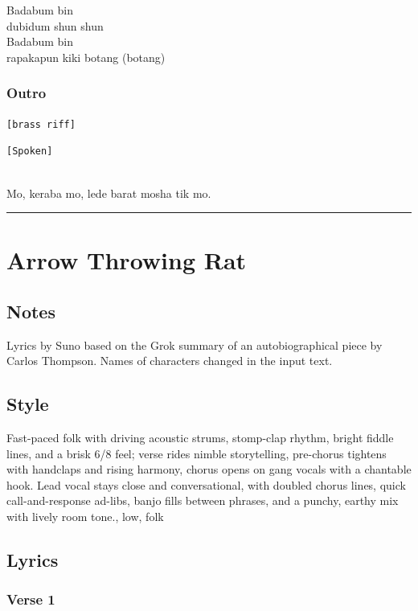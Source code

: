 Badabum bin\\
dubidum shun shun\\
Badabum bin\\
rapakapun kiki botang (botang)

\subsubsection{Outro}\label{outro-5}

\texttt{{[}brass\ riff{]}}

\texttt{{[}Spoken{]}}\strut \\
Mo, keraba mo, lede barat mosha tik mo.

\begin{center}\rule{0.5\linewidth}{0.5pt}\end{center}

\section{Arrow Throwing Rat}\label{arrow-throwing-rat}

\subsection{Notes}\label{notes-24}

Lyrics by Suno based on the Grok summary of an autobiographical piece by
Carlos Thompson. Names of characters changed in the input text.

\subsection{Style}\label{style-23}

Fast-paced folk with driving acoustic strums, stomp-clap rhythm, bright
fiddle lines, and a brisk 6/8 feel; verse rides nimble storytelling,
pre-chorus tightens with handclaps and rising harmony, chorus opens on
gang vocals with a chantable hook. Lead vocal stays close and
conversational, with doubled chorus lines, quick call-and-response
ad-libs, banjo fills between phrases, and a punchy, earthy mix with
lively room tone., low, folk

\subsection{Lyrics}\label{lyrics-23}

\subsubsection{Verse 1}\label{verse-1-19}

